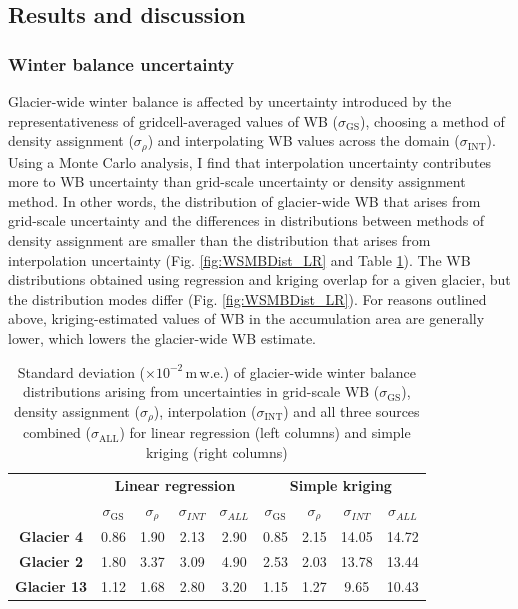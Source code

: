 \documentclass{sfuthesis}
\begin{document}
\subsection{Results and discussion}
\label{sec:Unc_results}

\subsubsection{Winter balance uncertainty}

Glacier-wide winter balance is affected by uncertainty introduced by the representativeness of gridcell-averaged values of WB ($\sigma_{\mathrm{GS}}$), choosing a method of density assignment ($\sigma_{\rho}$) and interpolating WB values across the domain ($\sigma_{\mathrm{INT}}$). Using a Monte Carlo analysis, I find that interpolation uncertainty contributes more to WB uncertainty than grid-scale uncertainty or density assignment method. In other words, the distribution of glacier-wide WB that arises from grid-scale uncertainty and the differences in distributions between methods of density assignment are smaller than the distribution that arises from interpolation uncertainty (Fig. \ref{fig:WSMBDist_LR} and Table \ref{tab:WSMBdistribution_sigma}). The WB distributions obtained using regression and kriging overlap for a given glacier, but the distribution modes differ (Fig. \ref{fig:WSMBDist_LR}). For reasons outlined above, kriging-estimated values of WB in the accumulation area are generally lower, which lowers the glacier-wide WB estimate. 

 \begin{table}[]
\centering
\caption{Standard deviation ($\times10^{-2}$\,m\,w.e.) of glacier-wide winter balance distributions arising from uncertainties in grid-scale WB ($\sigma_{\mathrm{GS}}$), density assignment ($\sigma_{\rho}$), interpolation ($\sigma_{\mathrm{INT}}$) and all three sources combined ($\sigma_{\mathrm{ALL}}$) for linear regression (left columns) and simple kriging (right columns)}
\label{tab:WSMBdistribution_sigma}
\begin{tabular}{c|cccc|cccc}
 & \multicolumn{4}{c|}{\textbf{Linear regression}} & \multicolumn{4}{c}{\textbf{Simple kriging}} \\
\textbf{} & $\sigma_{\mathrm{GS}}$ & $\sigma_{\rho}$ & $\sigma_{INT}$ & $\sigma_{ALL}$ & $\sigma_{\mathrm{GS}}$ & $\sigma_{\rho}$ & $\sigma_{INT}$ & $\sigma_{ALL}$ \\ \hline
\textbf{Glacier 4} & 0.86 & 1.90 & 2.13 & 2.90 & 0.85 & 2.15 & 14.05 & 14.72 \\
\textbf{Glacier 2} & 1.80 & 3.37 & 3.09 & 4.90 & 2.53 & 2.03 & 13.78 & 13.44 \\
\textbf{Glacier 13} & 1.12 & 1.68 & 2.80 & 3.20 & 1.15 & 1.27 & 9.65 & 10.43
\end{tabular}
\end{table}
\end{document}
